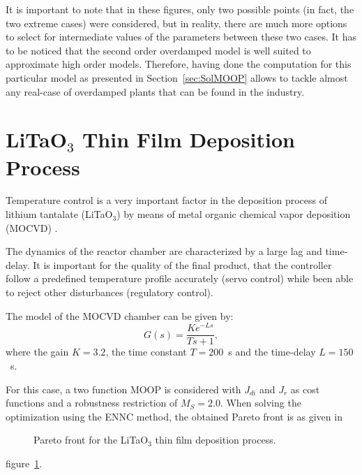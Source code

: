 It is important to note that in these figures, only two possible points (in fact, the two extreme cases) were considered, but in reality, there are much more options to select for intermediate values of the parameters between these two cases. It has to be noticed that the second order overdamped model is well suited to approximate high order models. Therefore, having done the computation for this particular model as presented in Section~\ref{sec:SolMOOP} allows to tackle almost any real-case of overdamped plants that can be found in the industry.
\section{LiTaO$_3$ Thin Film Deposition Process}
\label{sec:LiTAO3}
Temperature control is a very important factor in the deposition process of lithium tantalate (LiTaO$_3$) by means of metal organic chemical vapor deposition (MOCVD) \citep{Zhang2004}.

The dynamics of the reactor chamber are characterized by a large lag and time-delay. It is important for the quality of the final product, that the controller follow a predefined temperature profile accurately (servo control) while been able to reject other disturbances (regulatory control).

The model of the MOCVD chamber can be given by:
\begin{equation}
G(s) = \frac{K e^{-L s}}{T s+1},
\label{eq:GsLita}
\end{equation}
%
where the gain $K = 3.2$, the time constant $T = 200$~s and the time-delay $L = 150$~s.

For this case, a two function MOOP is considered with $J_{di}$ and $J_{r}$ as cost functions and a robustness restriction of $M_S = 2.0$. When solving the optimization using the ENNC method, the obtained Pareto front is as given in %
\begin{figure}[tb]
	\centering
	\caption{Pareto front for the LiTaO$_3$ thin film deposition process.}
	\label{fig:LitaPareto}
\end{figure}
%
figure~\ref{fig:LitaPareto}.

